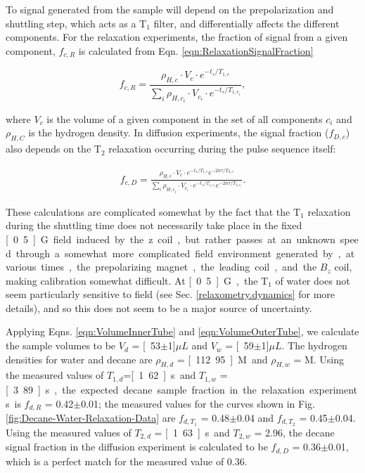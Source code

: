 \documentclass[PaulGanssle-Thesis.tex]{subfiles}
\begin{document}
To signal generated from the sample will depend on the prepolarization and shuttling step, which acts as a $\mathrm{T}_{1}$ filter, and differentially affects the different components. For the relaxation experiments, the fraction of signal from a given component, $f_{c,R}$ is calculated from Eqn. \ref{eqn:RelaxationSignalFraction}

\begin{equation}
f_{c,R}  =  \frac{\rho_{H,c}\cdot V_{c}\cdot e^{-t_s/T_{1,c}}}{\sum\limits_{i}\rho_{H,c_{i}}\cdot V_{c_{i}}\cdot{}e^{-t_{s}/T_{1,c_{i}}}},
\label{eqn:RelaxationSignalFraction}
\end{equation}

where $V_{c}$ is the volume of a given component in the set of all components $c_{i}$ and $\rho_{H,C}$ is the hydrogen density. In diffusion experiments, the signal fraction ($f_{D,c}$) also depends on the $\mathrm{T}_{2}$ relaxation occurring during the pulse sequence itself:

\begin{align}
f_{c,D} = \frac{\rho_{H,c}\cdot V_{c}\cdot e^{-t_s/T_{1,c}}e^{-2n\tau/T_{2,c}}}{\sum\limits_{i}\rho_{H,c_{i}}\cdot V_{c_{i}}\cdot{}e^{-t_{s}/T_{1,c_{i}}}e^{-2n\tau/T_{2,c_{i}}}}.
\label{eqn:DiffusionSignalFraction}
\end{align}

These calculations are complicated somewhat by the fact that the $\mathrm{T}_{1}$ relaxation during the shuttling time does not necessarily take place in the fixed \unit[0.5]{G} field induced by the z coil, but rather passes at an unknown speed through a somewhat more complicated field environment generated by, at various times, the prepolarizing magnet, the leading coil, and the $B_z$ coil, making calibration somewhat difficult. At \unit[0.5]{G}, the $\mathrm{T}_{1}$ of water does not seem particularly sensitive to field (see Sec. \ref{relaxometry.dynamics} for more details), and so this does not seem to be a major source of uncertainty.

Applying Eqns. \ref{eqn:VolumeInnerTube} and \ref{eqn:VolumeOuterTube}, we calculate the sample volumes to be $V_{d}$ = \unit[53$\pm$1]{$\mu{}L$} and $V_{w}$ = \unit[59$\pm$1]{$\mu{}L$}. The hydrogen densities for water and decane are $\rho_{H,d}$ = \unit[112.95]{M} and $\rho_{H,w}$ = \unit[110]{M}. Using the measured values of $T_{1,d}$=\unit[1.62]{s} and $T_{1,w}$ = \unit[3.89]{s}, the expected decane sample fraction in the relaxation experiments is $f_{d,R}$ = 0.42$\pm$0.01; the measured values for the curves shown in Fig. \ref{fig:Decane-Water-Relaxation-Data} are $f_{d,T_1}$ = 0.48$\pm$0.04 and $f_{d,T_2}$ = 0.45$\pm$0.04. Using the measured values of $T_{2,d}$ = \unit[1.63]{s} and $T_{2,w}$ = 2.96, the decane signal fraction in the diffusion experiment is calculated to be $f_{d,D}$ = 0.36$\pm$0.01, which is a perfect match for the measured value of 0.36.
\end{document}
